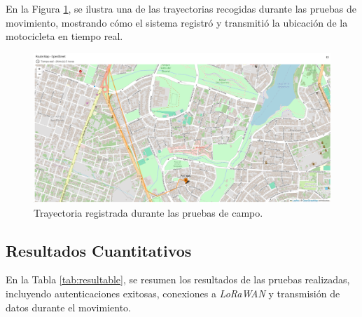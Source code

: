 En la Figura \ref{fig:trayectoris}, se ilustra una de las trayectorias recogidas durante las pruebas de movimiento, mostrando cómo el sistema registró y transmitió la ubicación de la motocicleta en tiempo real.

\begin{figure}[H]
\leavevmode
\begin{minipage}{\textwidth}
\begin{center}
\includegraphics[width=1.0\textwidth]{./capitulo_05/imagen/mapa1.png}
\caption{Trayectoria registrada durante las pruebas de campo.\label{fig:trayectoris}}
\end{center}
\end{minipage}
\end{figure}

\subsection{Resultados Cuantitativos}

En la Tabla \ref{tab:resultable}, se resumen los resultados de las pruebas realizadas, incluyendo autenticaciones exitosas, conexiones a \textit{LoRaWAN} y transmisión de datos durante el movimiento.

